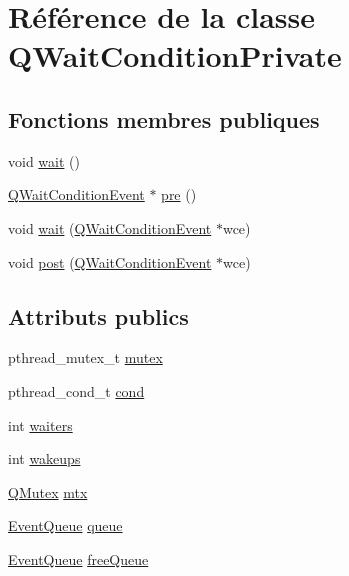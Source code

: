 \hypertarget{class_q_wait_condition_private}{}\section{Référence de la classe Q\+Wait\+Condition\+Private}
\label{class_q_wait_condition_private}
\subsection*{Fonctions membres publiques}
\begin{DoxyCompactItemize}
\item 
void \hyperlink{class_q_wait_condition_private_a2864b8d283d2a2c757e825e5dc8a24d0}{wait} ()
\item 
\hyperlink{class_q_wait_condition_event}{Q\+Wait\+Condition\+Event} $\ast$ \hyperlink{class_q_wait_condition_private_a7cf44da862c6a1fca494253cd0568f53}{pre} ()
\item 
void \hyperlink{class_q_wait_condition_private_a0d3212d380cfcebb7d2e5b02084779c2}{wait} (\hyperlink{class_q_wait_condition_event}{Q\+Wait\+Condition\+Event} $\ast$wce)
\item 
void \hyperlink{class_q_wait_condition_private_af61c25946c95528afeb30c4ac26e4f40}{post} (\hyperlink{class_q_wait_condition_event}{Q\+Wait\+Condition\+Event} $\ast$wce)
\end{DoxyCompactItemize}
\subsection*{Attributs publics}
\begin{DoxyCompactItemize}
\item 
pthread\+\_\+mutex\+\_\+t \hyperlink{class_q_wait_condition_private_a361375d2df4f05c0dddfc1f95832a73b}{mutex}
\item 
pthread\+\_\+cond\+\_\+t \hyperlink{class_q_wait_condition_private_abcfdb90df4a7edd76960e7ce3e7d11c7}{cond}
\item 
int \hyperlink{class_q_wait_condition_private_ae4a4fc8e92470eb0a2032dd9a1cd0c92}{waiters}
\item 
int \hyperlink{class_q_wait_condition_private_aa89133c3205f41565f70014242dbb6ba}{wakeups}
\item 
\hyperlink{class_q_mutex}{Q\+Mutex} \hyperlink{class_q_wait_condition_private_ae775be2a78da7b5bfc8e6159a5b1a230}{mtx}
\item 
\hyperlink{class_event_queue}{Event\+Queue} \hyperlink{class_q_wait_condition_private_ab312b34eeb97bd25d20b86b9fff1de16}{queue}
\item 
\hyperlink{class_event_queue}{Event\+Queue} \hyperlink{class_q_wait_condition_private_a3b96ce780ed74cb13bcee57f7044f24a}{free\+Queue}
\end{DoxyCompactItemize}


